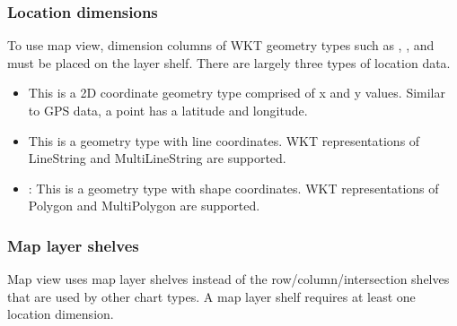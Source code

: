 \documentclass[letterpaper,10pt,english]{sphinxmanual}
\begin{document}
\subsubsection{Location dimensions}
\label{\detokenize{discovery/part04/map_chart:id2}}
To use map view, dimension columns of WKT geometry types such as , , and   must be placed on the layer shelf. There are largely three types of location data.
\begin{itemize}
\item {} 
 This is a 2D coordinate geometry type comprised of x and y values. Similar to GPS data, a point has a latitude and longitude.

\item {} 
 This is a geometry type with line coordinates. WKT representations of LineString and MultiLineString are supported.

\item {} 
: This is a geometry type with shape coordinates. WKT representations of Polygon and MultiPolygon are supported.
\begin{quote}

\begin{figure}[H]
\centering

\noindent{}
\end{figure}
\end{quote}

\end{itemize}


\subsubsection{Map layer shelves}
\label{\detokenize{discovery/part04/map_chart:id3}}\begin{quote}

\begin{figure}[H]
\centering

\noindent{}
\end{figure}
\end{quote}

Map view uses map layer shelves instead of the row/column/intersection shelves that are used by other chart types. A map layer shelf requires at least one location dimension.
\begin{quote}

\begin{figure}[H]
\centering

\noindent{}
\end{figure}
\end{quote}
\end{document}
